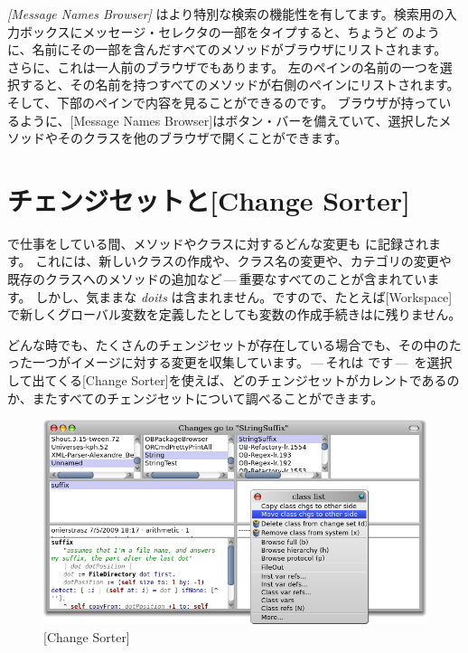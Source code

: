 \documentclass[a4paper,10pt,twoside]{book}
\begin{document}
\emph{[Message Names Browser]} はより特別な検索の機能性を有してます。検索用の入力ボックスにメッセージ・セレクタの一部をタイプすると、ちょうど  のように、名前にその一部を含んだすべてのメソッドがブラウザにリストされます。
さらに、これは一人前のブラウザでもあります。
左のペインの名前の一つを選択すると、その名前を持つすべてのメソッドが右側のペインにリストされます。そして、下部のペインで内容を見ることができるのです。
ブラウザが持っているように、[Message Names Browser]はボタン・バーを備えていて、選択したメソッドやそのクラスを他のブラウザで開くことができます。


\section{チェンジセットと[Change Sorter]}

\pharo で仕事をしている間、メソッドやクラスに対するどんな変更も  に記録されます。
これには、新しいクラスの作成や、クラス名の変更や、カテゴリの変更や既存のクラスへのメソッドの追加など\,---\,重要なすべてのことが含まれています。
しかし、気ままな \emph{doits} は含まれません。ですので、たとえば[Workspace]で新しくグローバル変数を定義したとしても変数の作成手続きはに残りません。

どんな時でも、たくさんのチェンジセットが存在している場合でも、その中のたった一つがイメージに対する変更を収集しています。\,---\,それは  です\,---\, 
を選択して出てくる[Change Sorter]を使えば、どのチェンジセットがカレントであるのか、またすべてのチェンジセットについて調べることができます。

\begin{figure}[btp]
	\begin{center}
		\includegraphics[width=\linewidth]{changeSorter}
	\end{center}
	\caption{[Change Sorter]}
\end{figure}
\end{document}
